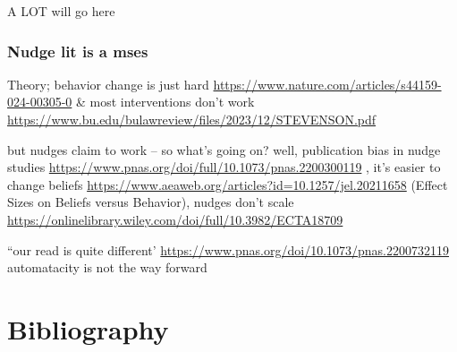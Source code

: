\documentclass[sn-nature,pdflatex]{sn-jnl}
\begin{document}
A LOT will go here

\subsubsection{Nudge lit is a mses}\label{nudge-lit-is-a-mses}

Theory; behavior change is just hard
\url{https://www.nature.com/articles/s44159-024-00305-0} \& most
interventions don't work
\url{https://www.bu.edu/bulawreview/files/2023/12/STEVENSON.pdf}

but nudges claim to work -- so what's going on? well, publication bias
in nudge studies
\url{https://www.pnas.org/doi/full/10.1073/pnas.2200300119} , it's
easier to change beliefs
\url{https://www.aeaweb.org/articles?id=10.1257/jel.20211658} (Effect
Sizes on Beliefs versus Behavior), nudges don't scale
\url{https://onlinelibrary.wiley.com/doi/full/10.3982/ECTA18709}

``our read is quite different'
\url{https://www.pnas.org/doi/10.1073/pnas.2200732119} automatacity is
not the way forward

\section{Bibliography}\label{bibliography}

\renewcommand\refname{References}

\end{document}
